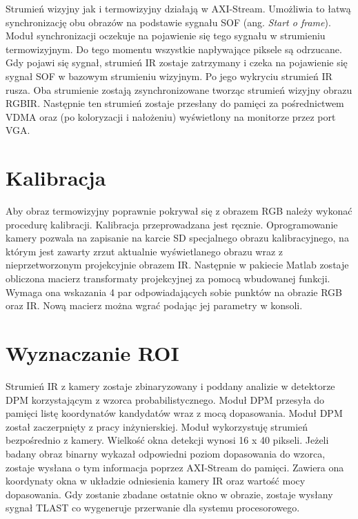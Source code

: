 Strumień wizyjny jak i termowizyjny działają w AXI-Stream. %
Umożliwia to łatwą synchronizację obu obrazów na podstawie sygnału SOF (ang. \textit{Start o frame}). 
Moduł synchronizacji oczekuje na pojawienie się tego sygnału w strumieniu termowizyjnym. 
Do tego momentu wszystkie napływające piksele są odrzucane. 
Gdy pojawi się sygnał, strumień IR zostaje zatrzymany i czeka na pojawienie się sygnał SOF w bazowym strumieniu wizyjnym. 
Po jego wykryciu strumień IR rusza. %
Oba strumienie zostają zsynchronizowane tworząc strumień wizyjny obrazu RGBIR. 
Następnie ten strumień zostaje przesłany do pamięci za pośrednictwem VDMA oraz (po koloryzacji i nałożeniu) wyświetlony na monitorze przez port VGA.

\section{Kalibracja}

Aby obraz termowizyjny poprawnie pokrywał się z obrazem RGB należy wykonać procedurę kalibracji. 
Kalibracja przeprowadzana jest ręcznie. 
Oprogramowanie kamery pozwala na zapisanie na karcie SD specjalnego obrazu kalibracyjnego, na którym jest zawarty zrzut aktualnie wyświetlanego obrazu wraz z nieprzetworzonym projekcyjnie obrazem IR. %
Następnie w pakiecie Matlab zostaje obliczona macierz transformaty projekcyjnej za pomocą wbudowanej funkcji. 
Wymaga ona wskazania 4 par odpowiadających sobie punktów na obrazie RGB oraz IR. 
Nową macierz można wgrać podając jej parametry w konsoli. 



\section{Wyznaczanie ROI}

Strumień IR z kamery zostaje zbinaryzowany i poddany analizie w detektorze DPM korzystającym z wzorca probabilistycznego.  %
Moduł DPM przesyła do pamięci listę koordynatów kandydatów wraz z mocą dopasowania. %
Moduł DPM został zaczerpnięty z pracy inżynierskiej. %
Moduł wykorzystuję strumień bezpośrednio z kamery. %
Wielkość okna detekcji wynosi 16 x 40 pikseli. 
Jeżeli badany obraz binarny wykazał odpowiedni poziom dopasowania do wzorca, zostaje wysłana o tym informacja poprzez AXI-Stream do pamięci. 
Zawiera ona koordynaty okna w układzie odniesienia kamery IR oraz wartość mocy dopasowania. 
Gdy zostanie zbadane ostatnie okno w obrazie, zostaje wysłany sygnał TLAST co wygeneruje przerwanie dla systemu procesorowego.

